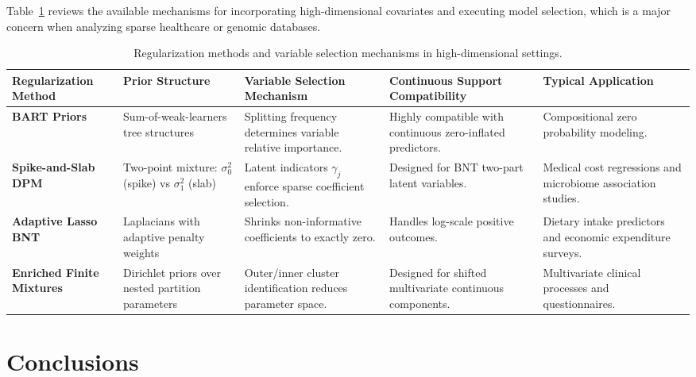 \documentclass[11pt, a4paper]{article}
\begin{document}
Table~\ref{tab:regularization} reviews the available mechanisms for incorporating high-dimensional covariates and executing model selection, which is a major concern when analyzing sparse healthcare or genomic databases.

\begin{table}[htbp]
\centering
\caption{Regularization methods and variable selection mechanisms in high-dimensional settings.}
\label{tab:regularization}
\small
\begin{tabularx}{\textwidth}{p{3.2cm} X X p{2.5cm} X}
\toprule
\textbf{Regularization Method} & \textbf{Prior Structure} & \textbf{Variable Selection Mechanism} & \textbf{Continuous Support Compatibility} & \textbf{Typical Application} \\
\midrule
\textbf{BART Priors} \cite{chipman2010, linero2018} & 
Sum-of-weak-learners tree structures & 
Splitting frequency determines variable relative importance.\cite{bleich2014} & 
Highly compatible with continuous zero-inflated predictors.\cite{chipman2010, linero2018} & 
Compositional zero probability modeling.\cite{chipman2010, linero2018} \\
\addlinespace
\textbf{Spike-and-Slab DPM} \cite{george1993, ishwaran2005, ishwaranrao2005} & 
Two-point mixture: $\sigma_0^2$ (spike) vs $\sigma_1^2$ (slab) & 
Latent indicators $\gamma_j$ enforce sparse coefficient selection.\cite{george1993} & 
Designed for BNT two-part latent variables.\cite{ishwaran2005} & 
Medical cost regressions and microbiome association studies.\cite{george1993, ishwaranrao2005} \\
\addlinespace
\textbf{Adaptive Lasso BNT} \cite{min2002, ishwaran2005} & 
Laplacians with adaptive penalty weights & 
Shrinks non-informative coefficients to exactly zero.\cite{min2002} & 
Handles log-scale positive outcomes.\cite{ishwaran2005} & 
Dietary intake predictors and economic expenditure surveys.\cite{min2002, ishwaran2005} \\
\addlinespace
\textbf{Enriched Finite Mixtures} \cite{dellaportas2006, papageorgiou2011} & 
Dirichlet priors over nested partition parameters & 
Outer/inner cluster identification reduces parameter space.\cite{dellaportas2006} & 
Designed for shifted multivariate continuous components.\cite{papageorgiou2011} & 
Multivariate clinical processes and questionnaires.\cite{dellaportas2006} \\
\bottomrule
\end{tabularx}
\end{table}


\section{Conclusions}
\end{document}

